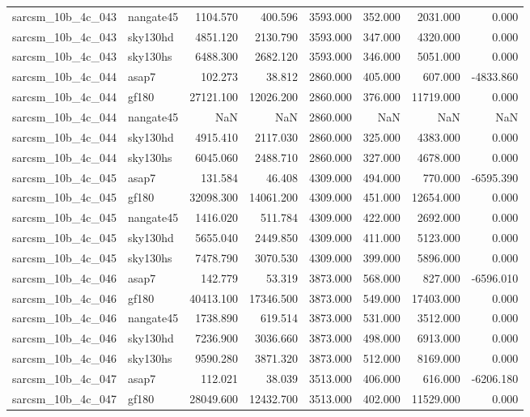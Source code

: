 \begin{tabular}{llrrrrrr}
sarcsm\_10b\_4c\_043 & nangate45 & 1104.570 & 400.596 & 3593.000 & 352.000 & 2031.000 & 0.000 \\
sarcsm\_10b\_4c\_043 & sky130hd & 4851.120 & 2130.790 & 3593.000 & 347.000 & 4320.000 & 0.000 \\
sarcsm\_10b\_4c\_043 & sky130hs & 6488.300 & 2682.120 & 3593.000 & 346.000 & 5051.000 & 0.000 \\
sarcsm\_10b\_4c\_044 & asap7 & 102.273 & 38.812 & 2860.000 & 405.000 & 607.000 & -4833.860 \\
sarcsm\_10b\_4c\_044 & gf180 & 27121.100 & 12026.200 & 2860.000 & 376.000 & 11719.000 & 0.000 \\
sarcsm\_10b\_4c\_044 & nangate45 & NaN & NaN & 2860.000 & NaN & NaN & NaN \\
sarcsm\_10b\_4c\_044 & sky130hd & 4915.410 & 2117.030 & 2860.000 & 325.000 & 4383.000 & 0.000 \\
sarcsm\_10b\_4c\_044 & sky130hs & 6045.060 & 2488.710 & 2860.000 & 327.000 & 4678.000 & 0.000 \\
sarcsm\_10b\_4c\_045 & asap7 & 131.584 & 46.408 & 4309.000 & 494.000 & 770.000 & -6595.390 \\
sarcsm\_10b\_4c\_045 & gf180 & 32098.300 & 14061.200 & 4309.000 & 451.000 & 12654.000 & 0.000 \\
sarcsm\_10b\_4c\_045 & nangate45 & 1416.020 & 511.784 & 4309.000 & 422.000 & 2692.000 & 0.000 \\
sarcsm\_10b\_4c\_045 & sky130hd & 5655.040 & 2449.850 & 4309.000 & 411.000 & 5123.000 & 0.000 \\
sarcsm\_10b\_4c\_045 & sky130hs & 7478.790 & 3070.530 & 4309.000 & 399.000 & 5896.000 & 0.000 \\
sarcsm\_10b\_4c\_046 & asap7 & 142.779 & 53.319 & 3873.000 & 568.000 & 827.000 & -6596.010 \\
sarcsm\_10b\_4c\_046 & gf180 & 40413.100 & 17346.500 & 3873.000 & 549.000 & 17403.000 & 0.000 \\
sarcsm\_10b\_4c\_046 & nangate45 & 1738.890 & 619.514 & 3873.000 & 531.000 & 3512.000 & 0.000 \\
sarcsm\_10b\_4c\_046 & sky130hd & 7236.900 & 3036.660 & 3873.000 & 498.000 & 6913.000 & 0.000 \\
sarcsm\_10b\_4c\_046 & sky130hs & 9590.280 & 3871.320 & 3873.000 & 512.000 & 8169.000 & 0.000 \\
sarcsm\_10b\_4c\_047 & asap7 & 112.021 & 38.039 & 3513.000 & 406.000 & 616.000 & -6206.180 \\
sarcsm\_10b\_4c\_047 & gf180 & 28049.600 & 12432.700 & 3513.000 & 402.000 & 11529.000 & 0.000 \\

\end{tabular}
